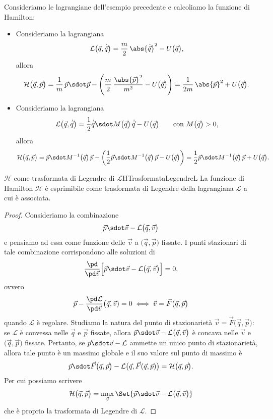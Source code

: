 \begin{ese}
	Consideriamo le lagrangiane dell'esempio precedente e calcoliamo la funzione di Hamilton:
	\begin{itemize}
		\item Consideriamo la lagrangiana
		      \[
			      \mathcal{L}\big(\vec{q},\dot{\vec{q}}\big) = \frac{m}{2}\,\abs{\dot{\vec{q}}}^2 -U\big(\vec{q}\big),
		      \]
		      allora
		      \[
			      \mathcal{H}\big(\vec{q},\vec{p}\big) = \frac{1}{m}\,\vec{p} \sdot \vec{p} - \left(\frac{m}{2}\,\frac{\abs{\vec{p}}^2}{m^2}-U\big(\vec{q}\big)\right) = \frac{1}{2m}\,\abs{\vec{p}}^2 + U\big(\vec{q}\big).
		      \]
		\item Consideriamo la lagrangiana
		      \[
			      \mathcal{L}\big(\vec{q},\dot{\vec{q}}\big) = \frac{1}{2}\dot{\vec{q}} \sdot M\big(\vec{q}\big)\,\dot{\vec{q}}-U\big(\vec{q}\big) \qquad\text{con }M\big(\vec{q}\big) > 0,
		      \]
		      allora
		      \[
			      \mathcal{H}\big(\vec{q},\vec{p}\big) = \vec{p} \sdot M^{-1}\big(\vec{q}\big)\,\vec{p} - \left(\frac{1}{2}\vec{p} \sdot M^{-1}\big(\vec{q}\big)\,\vec{p}-U\big(\vec{q}\big)\right) = \frac{1}{2}\vec{p} \sdot M^{-1}\big(\vec{q}\big)\,\vec{p} + U\big(\vec{q}\big).
		      \]
	\end{itemize}
\end{ese}

\begin{prop}{\(\mathcal{H}\) come trasformata di Legendre di \(\mathcal{L}\)}{HTrasformataLegendreL}
	La funzione di Hamilton \(\mathcal{H}\) è esprimibile come trasformata di Legendre della lagrangiana \(\mathcal{L}\) a cui è associata.
\end{prop}

\begin{proof}
	Consideriamo la combinazione
	\[
		\vec{p} \sdot \vec{v} - \mathcal{L}\big(\vec{q},\vec{v}\big)
	\]
	e pensiamo ad essa come funzione delle \(\vec{v}\) a \(\big(\vec{q},\vec{p}\big)\) fissate.
	I punti stazionari di tale combinazione corrispondono alle soluzioni di
	\[
		\frac{\pd}{\pd\vec{v}} \Big[\vec{p}\sdot\vec{v} - \mathcal{L}\big(\vec{q},\vec{v}\big)\Big] = 0,
	\]
	ovvero
	\[
		\vec{p} - \frac{\pd\mathcal{L}}{\pd\vec{v}}\big(\vec{q},\vec{v}) = 0 \iff \vec{v} = \vec{F}\big(\vec{q},\vec{p}\big)
	\]
	quando \(\mathcal{L}\) è regolare.
	Studiamo la natura del punto di stazionarietà \(\vec{v}=\vec{F}\big(\vec{q},\vec{p}\big)\):
	se \(\mathcal{L}\) è convessa nelle \(\vec{q}\) e \(\vec{p}\) fissate, allora \(\vec{p} \sdot \vec{v} - \mathcal{L}\big(\vec{q},\vec{v}\big)\) è concava nelle \(\vec{v}\) e \(\big(\vec{q},\vec{p}\big)\) fissate.
	Pertanto, se \(\vec{p}\sdot\vec{v}-\mathcal{L}\) ammette un unico punto di stazionarietà, allora tale punto è un massimo globale e il suo valore sul punto di massimo è
	\[
		\vec{p} \sdot \vec{F}\big(\vec{q},\vec{p}\big) -\mathcal{L}\big(\vec{q},\vec{F}(\vec{q},\vec{p})\big) = \mathcal{H}\big(\vec{q},\vec{p}\big).
	\]
	Per cui possiamo scrivere
	\[
		\mathcal{H}\big(\vec{q},\vec{p}\big) = \max_{\vec{v}}\Set{\vec{p}\sdot\vec{v}-\mathcal{L}\big(\vec{q},\vec{v}\big)}
	\]
	che è proprio la trasformata di Legendre di \(\mathcal{L}\).
\end{proof}

